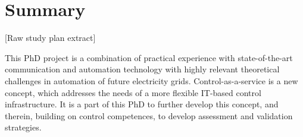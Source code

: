 \chapter{Summary}

[Raw study plan extract]

This PhD project is a combination of practical experience with state-of-the-art communication and automation technology with highly relevant theoretical challenges in automation of future electricity grids. Control-as-a-service is a new concept, which addresses the needs of a more flexible IT-based control infrastructure. It is a part of this PhD to further develop this concept, and therein, building on control competences, to develop assessment and validation strategies. 
